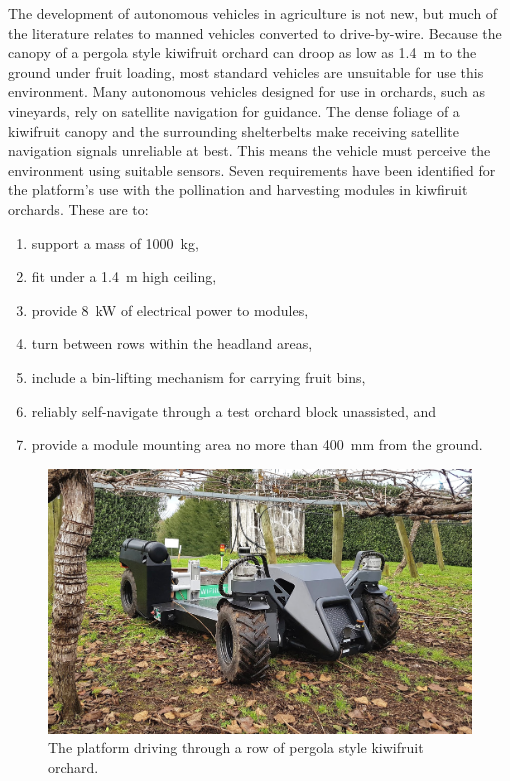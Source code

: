 \documentclass[preprint,authoryear,12pt]{elsarticle}
\begin{document}
    The development of autonomous vehicles in agriculture is not new, but much of the literature relates to manned vehicles converted to drive-by-wire.
    Because the canopy of a pergola style kiwifruit orchard can droop as low as \SI{1.4}{\meter} to the ground under fruit loading, most standard vehicles are unsuitable for use this environment.
    Many autonomous vehicles designed for use in orchards, such as vineyards, rely on satellite navigation for guidance.
    The dense foliage of a kiwifruit canopy and the surrounding shelterbelts make receiving satellite navigation signals unreliable at best.
    This means the vehicle must perceive the environment using suitable sensors.
    Seven requirements have been identified for the platform's use with the pollination and harvesting modules in kiwfiruit orchards.
    These are to:
    \begin{enumerate}
        \item support a mass of \SI{1000}{\kilo\gram},
        \item fit under a \SI{1.4}{\meter} high ceiling,
        \item provide \SI{8}{\kilo\watt} of electrical power to modules,
        \item turn between rows within the headland areas,
        \item include a bin-lifting mechanism for carrying fruit bins,
        \item reliably self-navigate through a test orchard block unassisted, and
        \item provide a module mounting area no more than \SI{400}{\milli\meter} from the ground.
    \end{enumerate}
    \begin{figure}[htb]
        \centering
        \includegraphics[width=\linewidth]{imgs/photos/suzy_general.jpg}
        \caption{
            The platform driving through a row of pergola style kiwifruit orchard.
        }
        \label{fig:suzy}
    \end{figure}
\end{document}
